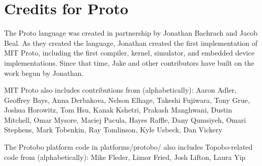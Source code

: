 
\section{Credits for Proto}

The Proto language was created in partnership by Jonathan Bachrach and
Jacob Beal.  As they created the language, Jonathan created the first
implementation of MIT Proto, including the first compiler, kernel,
simulator, and embedded device implementations.  Since that time, Jake
and other contributors have built on the work begun by Jonathan.

MIT Proto also includes contributions from (alphabetically):
%
Aaron Adler, Geoffrey Bays, Anna Derbakova, Nelson Elhage, Takeshi
Fujiwara, Tony Grue, Joshua Horowitz, Tom Hsu, Kanak Kshetri, Prakash
Manghwani, Dustin Mitchell, Omar Mysore, Maciej Pacula, Hayes Raffle,
Dany Qumsiyeh, Omari Stephens, Mark Tobenkin, Ray Tomlinson, Kyle
Usbeck, Dan Vickery

The Protobo platform code in platforms/protobo/ also includes 
Topobo-related code from (alphabetically):
%
  Mike Fleder, Limor Fried, Josh Lifton, Laura Yip
